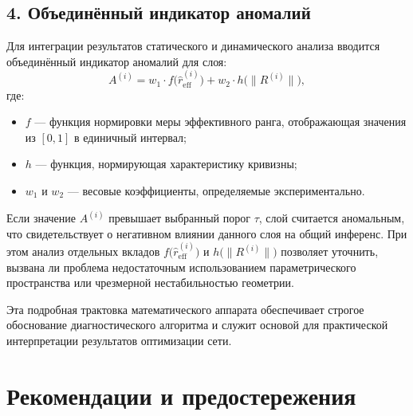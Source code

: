 \documentclass[a4paper,12pt]{article}
\begin{document}
\subsection*{4. Объединённый индикатор аномалий}

Для интеграции результатов статического и динамического анализа вводится объединённый индикатор аномалий для слоя:
\[
A^{(i)} = w_1 \cdot f\bigl(\hat{r}_{\text{eff}}^{(i)}\bigr) + w_2 \cdot h\bigl(\|R^{(i)}\|\bigr),
\]
где:
\begin{itemize}[leftmargin=1.5cm]
    \item \( f \) --- функция нормировки меры эффективного ранга, отображающая значения из \([0,1]\) в единичный интервал;
    \item \( h \) --- функция, нормирующая характеристику кривизны;
    \item \( w_1 \) и \( w_2 \) --- весовые коэффициенты, определяемые экспериментально.
\end{itemize}

Если значение \( A^{(i)} \) превышает выбранный порог \(\tau\), слой считается аномальным, что свидетельствует о негативном влиянии данного слоя на общий инференс. При этом анализ отдельных вкладов \( f\bigl(\hat{r}_{\text{eff}}^{(i)}\bigr) \) и \( h\bigl(\|R^{(i)}\|\bigr) \) позволяет уточнить, вызвана ли проблема недостаточным использованием параметрического пространства или чрезмерной нестабильностью геометрии.

Эта подробная трактовка математического аппарата обеспечивает строгое обоснование диагностического алгоритма и служит основой для практической интерпретации результатов оптимизации сети.

\bigskip

\section{Рекомендации и предостережения}
\end{document}
